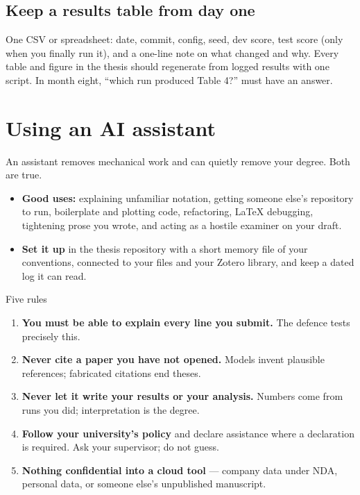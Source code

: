 \documentclass[11pt,a4paper]{article}
\begin{document}
\subsection{Keep a results table from day one}

One CSV or spreadsheet: date, commit, config, seed, dev score, test score
(only when you finally run it), and a one-line note on what changed and why.
Every table and figure in the thesis should regenerate from logged results
with one script. In month eight, ``which run produced Table 4?'' must have an
answer.

\section{Using an AI assistant}

An assistant removes mechanical work and can quietly remove your degree. Both
are true.

\begin{itemize}
  \item \textbf{Good uses:} explaining unfamiliar notation, getting someone
        else's repository to run, boilerplate and plotting code, refactoring,
        LaTeX debugging, tightening prose you wrote, and acting as a hostile
        examiner on your draft.
  \item \textbf{Set it up} in the thesis repository with a short memory file
        of your conventions, connected to your files and your Zotero library,
        and keep a dated  log it can read.
\end{itemize}

\begin{wbox}{Five rules}
\begin{enumerate}
  \item \textbf{You must be able to explain every line you submit.} The
        defence tests precisely this.
  \item \textbf{Never cite a paper you have not opened.} Models invent
        plausible references; fabricated citations end theses.
  \item \textbf{Never let it write your results or your analysis.} Numbers
        come from runs you did; interpretation is the degree.
  \item \textbf{Follow your university's policy} and declare assistance where
        a declaration is required. Ask your supervisor; do not guess.
  \item \textbf{Nothing confidential into a cloud tool} --- company data under
        NDA, personal data, or someone else's unpublished manuscript.
\end{enumerate}
\end{wbox}
\end{document}
